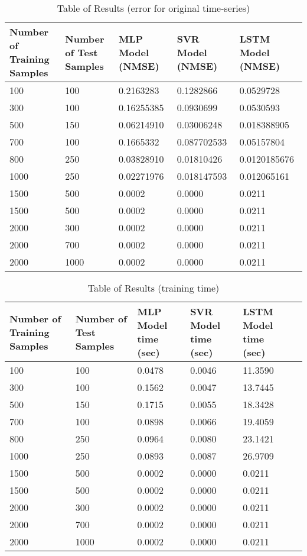 \documentclass{article}
\begin{document}
\begin{table}[ht]
	\centering
	\begin{tabular}{p{2cm} p{2cm} p{2cm} p{2cm} p{2cm}}
		\toprule
		Number of Training Samples & Number of Test Samples & MLP Model (NMSE) & SVR Model (NMSE) & LSTM Model (NMSE) \\
		\midrule
		100 & 100 & 0.2163283 & 0.1282866 & 0.0529728 \\
		\midrule
		300 & 100 & 0.16255385 & 0.0930699 & 0.0530593 \\
		\midrule
		500 & 150 & 0.06214910 & 0.03006248 & 0.018388905 \\
		\midrule
		700 & 100 & 0.1665332 & 0.087702533 & 0.05157804 \\
		\midrule
		800 & 250 & 0.03828910 & 0.01810426 & 0.0120185676 \\
		\midrule
		1000 & 250 & 0.02271976  & 0.018147593 & 0.012065161 \\
		\midrule
		1500 & 500 & 0.0002 & 0.0000 & 0.0211 \\
		\midrule
		1500 & 500 & 0.0002 & 0.0000 & 0.0211 \\
		\midrule
		2000 & 300 & 0.0002 & 0.0000 & 0.0211 \\
		\midrule
		2000 & 700 & 0.0002 & 0.0000 & 0.0211 \\
		\midrule
		2000 & 1000 & 0.0002 & 0.0000 & 0.0211 \\
		\bottomrule
	\end{tabular}
	\caption{Table of Results (error for original time-series)}
\end{table}

\begin{table}[ht]
	\centering
	\begin{tabular}{p{2cm} p{2cm} p{2cm} p{2cm} p{2cm} p{2cm}}
		\toprule
		Number of Training Samples & Number of Test Samples & MLP Model time (sec) & SVR Model time (sec) & LSTM Model time (sec) \\
		\midrule
		100 & 100 & 0.0478 & 0.0046 & 11.3590 \\
		\midrule
		300 & 100 & 0.1562 & 0.0047 & 13.7445 \\
		\midrule
		500 & 150 & 0.1715 & 0.0055 & 18.3428 \\
		\midrule
		700 & 100 & 0.0898 & 0.0066 & 19.4059 \\
		\midrule
		800 & 250 & 0.0964 & 0.0080 & 23.1421 \\
		\midrule
		1000 & 250 & 0.0893 & 0.0087 & 26.9709 \\
		\midrule
		1500 & 500 & 0.0002 & 0.0000 & 0.0211 \\
		\midrule
		1500 & 500 & 0.0002 & 0.0000 & 0.0211 \\
		\midrule
		2000 & 300 & 0.0002 & 0.0000 & 0.0211 \\
		\midrule
		2000 & 700 & 0.0002 & 0.0000 & 0.0211 \\
		\midrule
		2000 & 1000 & 0.0002 & 0.0000 & 0.0211 \\
		\bottomrule
	\end{tabular}
	\caption{Table of Results (training time)}
\end{table}
\end{document}
